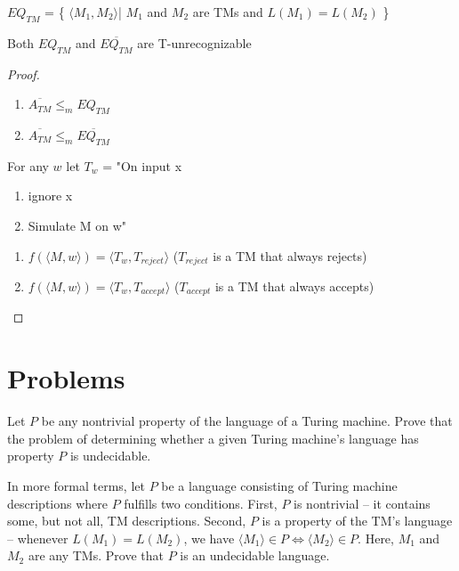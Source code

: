 \begin{theorem}
    \(EQ_{TM}\) = \{ \(\langle M_1, M_2 \rangle\)| \(M_1\) and \(M_2\) are TMs and \(L(M_1) = L(M_2)\)  \} 

    Both \(EQ_{TM}\) and \(\overline{EQ_{TM}}\) are T-unrecognizable  
\end{theorem}
\begin{proof}
    \begin{enumerate}
        \item 
        \(
        \overline{A_{TM}} \leq_m EQ_{TM} 
        \) 
        \item
        \(
        \overline{A_{TM}} \leq_m \overline{EQ_{TM}}
        \) 
    \end{enumerate}

    For any \(w\) let \(T_w\) = "On input x
    \begin{enumerate}
        \item ignore x
        \item Simulate M on w"
    \end{enumerate}  

    \begin{enumerate}
        \item \(f(\langle M, w\rangle) = \langle T_w, T_{reject} \rangle\) (\( T_{reject}\) is a TM that always rejects) 
        \item \(f(\langle M, w\rangle) = \langle T_w, T_{accept} \rangle\) (\( T_{accept}\) is a TM that always accepts) 
    \end{enumerate}
\end{proof}

\section{Problems}

\begin{problem}
    Let \(P\) be any nontrivial property of the language of a Turing machine.
    Prove that the problem of determining whether a given Turing machine's language has property \(P\) is undecidable.

    In more formal terms, let \(P\) be a language consisting of Turing machine descriptions where \(P\) fulfills two conditions.  
    First, \(P\) is nontrivial -- it contains some, but not all, TM descriptions.  
    Second, \(P\) is a property of the TM's language -- whenever \(L(M_1) = L(M_2)\), we have \(\langle M_1 \rangle \in P \iff \langle M_2 \rangle \in P\).  
    Here, \(M_1\) and \(M_2\) are any TMs. Prove that \(P\) is an undecidable language.  
\end{problem}
